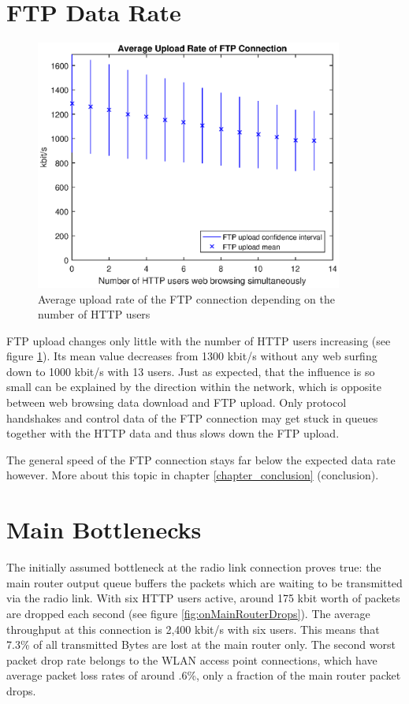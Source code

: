 \documentclass[a4paper,10pt]{book}\usepackage{graphicx}
\begin{document}
\section{FTP Data Rate}
\begin{figure}[!ht]
  \begin{center}
    \includegraphics[width=0.9\textwidth]{on_ftp_upload.eps}
    \caption{Average upload rate of the FTP connection depending on the number of HTTP users}
    \label{fig:onFtpUpload}
    \end{center}
\end{figure}

FTP upload changes only little with the number of HTTP users increasing (see figure \ref{fig:onFtpUpload}). Its mean value decreases from 1300 kbit/s without any web surfing down to 1000 kbit/s with 13 users. Just as expected, that the influence is so small can be explained by the direction within the network, which is opposite between web browsing data download and FTP upload. Only protocol handshakes and control data of the FTP connection may get stuck in queues together with the HTTP data and thus slows down the FTP upload.

The general speed of the FTP connection stays far below the expected data rate however. More about this topic in chapter \ref{chapter_conclusion} (conclusion).

\section{Main Bottlenecks}

The initially assumed bottleneck at the radio link connection proves true: the main router output queue buffers the packets which are waiting to be transmitted via the radio link. With six HTTP users active, around 175 kbit worth of packets are dropped each second (see figure \ref{fig:onMainRouterDrops}). The average throughput at this connection is 2,400 kbit/s with six users. This means that 7.3\% of all transmitted Bytes are lost at the main router only. The second worst packet drop rate belongs to the WLAN access point connections, which have average packet loss rates of around .6\%, only a fraction of the main router packet drops.
\end{document}
